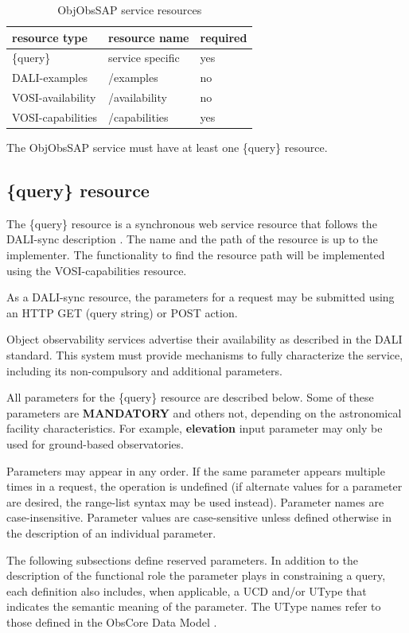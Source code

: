 \documentclass[11pt,a4paper]{ivoatex/ivoa}
\begin{document}
\begin{table}[h]
\centering
\begin{tabular}{|l|l|l|}
\hline
\textbf{resource type} & \textbf{resource name} & \textbf{required
} \\
\hline
\{query\} & service specific & yes \\
\hline
DALI-examples & /examples & no \\
\hline
VOSI-availability & /availability & no \\
\hline
VOSI-capabilities & /capabilities & yes \\
\hline
\end{tabular}
\caption{ObjObsSAP service resources}
\end{table}
The ObjObsSAP service must have at least one \{query\} resource.

\subsection{\{query\} resource} \label{sec:query}
The \{query\} resource is a synchronous web service resource that
follows the DALI-sync description . The name and the path of the
resource is up to the implementer. The functionality to find the
resource path will be implemented using the VOSI-capabilities
resource.

As a DALI-sync resource, the parameters for a request may be submitted
using an HTTP GET (query string) or POST action.

Object observability services advertise their availability as described in
the DALI standard. This system must provide mechanisms to fully
characterize the service, including its non-compulsory and additional
parameters.

All parameters for the \{query\} resource are described below. Some of
these parameters are \textbf{MANDATORY }and others not, depending on
the astronomical facility characteristics. For example, \textbf{
elevation} input parameter may only be used for ground-based
observatories.

Parameters may appear in any order. If the same parameter appears
multiple times in a request, the operation is undefined (if alternate
values for a parameter are desired, the range-list syntax may be used
instead). Parameter names are case-insensitive. Parameter values are
case-sensitive unless defined otherwise in the description of an
individual parameter.

The following subsections define reserved parameters. In addition to the
description of the functional role the parameter plays in constraining a
query, each definition also includes, when applicable, a UCD and/or
UType that indicates the semantic meaning of the parameter. The UType
names refer to those defined in the ObsCore Data Model .
\end{document}
